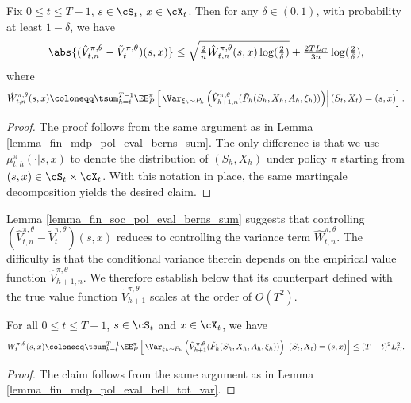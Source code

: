 \documentclass[9pt]{article}
\numberwithin{equation}{section}
\begin{document}
\begin{lemma} \label{lemma_fin_soc_pol_eval_berns_sum}
    Fix $0 \leq t \leq T-1$, $s \in \cS_t$, $x \in \cX_t$. Then for any $\delta \in (0, 1)$, with probability at least $1-\delta$, we have
    \begin{align}
        \abs{ (\hat{V}_{t,n}^{\pi, \theta} - \tilde{V}_t^{\pi, \theta})(s,x)} \leq \sqrt{\tfrac{2}{n} \hat{W}_{t,n}^{\pi, \theta} (s,x) \log(\tfrac{2}{\delta})} + \tfrac{2 T L_C}{3n}\log(\tfrac{2}{\delta}), \nonumber
    \end{align}
    where
    \begin{align}
        \hat{W}_{t,n}^{\pi, \theta} (s,x) \coloneqq \tsum_{h=t}^{T-1} \EE_{P}^\pi \left[ \left. \Var_{\xi_h \sim P_h} \left(\hat{V}_{h+1,n}^{\pi, \theta}(\tilde{F}_h(S_h, X_h, A_h, \xi_h))\right) \right| (S_t, X_t) = (s,x) \right]. \nonumber
    \end{align}
\end{lemma}
\begin{proof}
    The proof follows from the same argument as in Lemma \ref{lemma_fin_mdp_pol_eval_berns_sum}. 
    The only difference is that we use $\mu_{t,h}^{\pi}(\cdot|s,x)$ to denote the distribution of $(S_h, X_h)$ under policy $\pi$ starting from $(s,x) \in \cS_t \times \cX_t$. With this notation in place, the same martingale decomposition yields the desired claim.
\end{proof}

Lemma \ref{lemma_fin_soc_pol_eval_berns_sum} suggests that controlling $(\hat{V}_{t,n}^{\pi,\theta}-\tilde{V}_t^{\pi,\theta})(s,x)$ reduces to controlling the variance term $\widehat{W}_{t,n}^{\pi,\theta}$. The difficulty is that the conditional variance therein depends on the empirical value function $\hat{V}_{h+1,n}^{\pi,\theta}$. We therefore establish below that its counterpart defined with the true value function $\tilde{V}_{h+1}^{\pi,\theta}$ scales at the order of $O(T^2)$.
%
\begin{lemma} \label{lemma_fin_soc_pol_eval_bell_tot_var}
    For all $0 \leq t \leq T-1$, $s \in \cS_t$ and $x \in \cX_t$, we have
    \begin{align}
        W_t^{\pi, \theta}(s,x) \coloneqq \tsum_{h=t}^{T-1} \EE_{P}^\pi \left[ \left. \Var_{\xi_h \sim P_h} \left(\tilde{V}_{h+1}^{\pi, \theta}(\tilde{F}_h(S_h, X_h, A_h, \xi_h))\right) \right| (S_t, X_t) = (s,x) \right] \leq (T-t)^2 L_C^2. \nonumber
    \end{align}
\end{lemma}
\begin{proof}
    The claim follows from the same argument as in Lemma \ref{lemma_fin_mdp_pol_eval_bell_tot_var}.
\end{proof}
\end{document}
